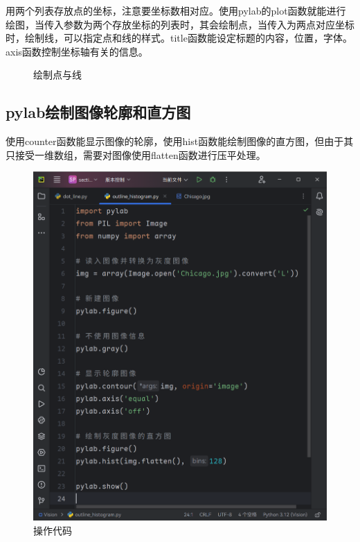 \documentclass[fontset=ubuntu]{ctexart}
\begin{document}
用两个列表存放点的坐标，注意要坐标数相对应。使用pylab的plot函数就能进行绘图，当传入参数为两个存放坐标的列表时，其会绘制点，当传入为两点对应坐标时，绘制线，可以指定点和线的样式。title函数能设定标题的内容，位置，字体。axis函数控制坐标轴有关的信息。
\begin{figure}[htb]
    \centering
    \caption{绘制点与线}
    \label{dot_line}
\end{figure}

\subsection{pylab绘制图像轮廓和直方图}
使用counter函数能显示图像的轮廓，使用hist函数能绘制图像的直方图，但由于其只接受一维数组，需要对图像使用flatten函数进行压平处理。
\begin{figure}[htb]
    \centering
    \includegraphics[width=0.4\linewidth]{outline_histogram_1.png}
    \caption{操作代码}
    \label{fig:outline_histogram_1}
\end{figure}
\end{document}
